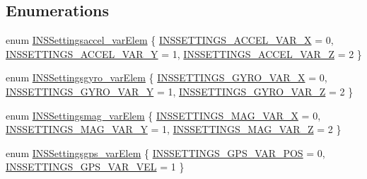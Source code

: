 \subsection*{\-Enumerations}
\begin{DoxyCompactItemize}
\item 
enum \hyperlink{group___i_n_s_settings_gaa0983ef41b0a08ff4f4895a787e126ce}{\-I\-N\-S\-Settingsaccel\-\_\-var\-Elem} \{ \hyperlink{group___i_n_s_settings_ggaa0983ef41b0a08ff4f4895a787e126cead613d7dec4daaa6dfffccfda26067a62}{\-I\-N\-S\-S\-E\-T\-T\-I\-N\-G\-S\-\_\-\-A\-C\-C\-E\-L\-\_\-\-V\-A\-R\-\_\-\-X} = 0, 
\hyperlink{group___i_n_s_settings_ggaa0983ef41b0a08ff4f4895a787e126cea1cd17eb3d07ccbbb6b261d21482d5157}{\-I\-N\-S\-S\-E\-T\-T\-I\-N\-G\-S\-\_\-\-A\-C\-C\-E\-L\-\_\-\-V\-A\-R\-\_\-\-Y} = 1, 
\hyperlink{group___i_n_s_settings_ggaa0983ef41b0a08ff4f4895a787e126cea8a6bdd960ef87c15d4390708413d7502}{\-I\-N\-S\-S\-E\-T\-T\-I\-N\-G\-S\-\_\-\-A\-C\-C\-E\-L\-\_\-\-V\-A\-R\-\_\-\-Z} = 2
 \}
\item 
enum \hyperlink{group___i_n_s_settings_ga6240d6b4b682049c44dd5c65d328478b}{\-I\-N\-S\-Settingsgyro\-\_\-var\-Elem} \{ \hyperlink{group___i_n_s_settings_gga6240d6b4b682049c44dd5c65d328478ba9d54387a9756b6df6a3291afcaa50d60}{\-I\-N\-S\-S\-E\-T\-T\-I\-N\-G\-S\-\_\-\-G\-Y\-R\-O\-\_\-\-V\-A\-R\-\_\-\-X} = 0, 
\hyperlink{group___i_n_s_settings_gga6240d6b4b682049c44dd5c65d328478ba69dd3e264a959c01d96664d77623473d}{\-I\-N\-S\-S\-E\-T\-T\-I\-N\-G\-S\-\_\-\-G\-Y\-R\-O\-\_\-\-V\-A\-R\-\_\-\-Y} = 1, 
\hyperlink{group___i_n_s_settings_gga6240d6b4b682049c44dd5c65d328478ba07e852b803582453f6bd57f1eeb2a064}{\-I\-N\-S\-S\-E\-T\-T\-I\-N\-G\-S\-\_\-\-G\-Y\-R\-O\-\_\-\-V\-A\-R\-\_\-\-Z} = 2
 \}
\item 
enum \hyperlink{group___i_n_s_settings_gae19f7c5a10185e6dfc48606c2cc0f738}{\-I\-N\-S\-Settingsmag\-\_\-var\-Elem} \{ \hyperlink{group___i_n_s_settings_ggae19f7c5a10185e6dfc48606c2cc0f738a8a2aef99923f5ce02f9f4f20adffb421}{\-I\-N\-S\-S\-E\-T\-T\-I\-N\-G\-S\-\_\-\-M\-A\-G\-\_\-\-V\-A\-R\-\_\-\-X} = 0, 
\hyperlink{group___i_n_s_settings_ggae19f7c5a10185e6dfc48606c2cc0f738aec683830789d264ac9fb0c7872318215}{\-I\-N\-S\-S\-E\-T\-T\-I\-N\-G\-S\-\_\-\-M\-A\-G\-\_\-\-V\-A\-R\-\_\-\-Y} = 1, 
\hyperlink{group___i_n_s_settings_ggae19f7c5a10185e6dfc48606c2cc0f738a92c79f509a6dbd8194bb4e380114ce7b}{\-I\-N\-S\-S\-E\-T\-T\-I\-N\-G\-S\-\_\-\-M\-A\-G\-\_\-\-V\-A\-R\-\_\-\-Z} = 2
 \}
\item 
enum \hyperlink{group___i_n_s_settings_ga26d620e91351882f48b3a084941b36ac}{\-I\-N\-S\-Settingsgps\-\_\-var\-Elem} \{ \hyperlink{group___i_n_s_settings_gga26d620e91351882f48b3a084941b36aca0cd6ec0e77a7ab1e392c438b01afb530}{\-I\-N\-S\-S\-E\-T\-T\-I\-N\-G\-S\-\_\-\-G\-P\-S\-\_\-\-V\-A\-R\-\_\-\-P\-O\-S} = 0, 
\hyperlink{group___i_n_s_settings_gga26d620e91351882f48b3a084941b36acaa5e02e9ffa4f6c115b9ef38ad955b4f4}{\-I\-N\-S\-S\-E\-T\-T\-I\-N\-G\-S\-\_\-\-G\-P\-S\-\_\-\-V\-A\-R\-\_\-\-V\-E\-L} = 1
 \}
\end{DoxyCompactItemize}
